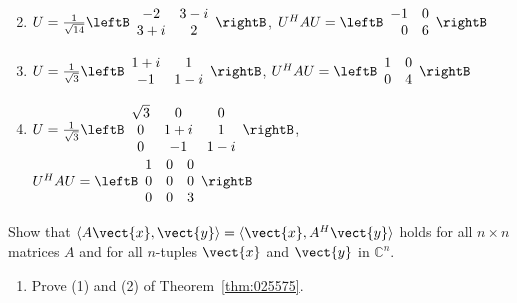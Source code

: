 \begin{multicols}{2}
\begin{ex}
\begin{enumerate}[label={\alph*.}]
\end{enumerate}
\begin{sol}
\begin{enumerate}[label={\alph*.}]
\setcounter{enumi}{1}
\item  $U = \frac{1}{\sqrt{14}}\leftB \begin{array}{cc}
-2 & 3 - i \\
3 + i & 2
\end{array}\rightB$, $U^HAU = \leftB \begin{array}{rr}
-1 & 0 \\
0 & 6
\end{array}\rightB$

\setcounter{enumi}{3}
\item  $U = \frac{1}{\sqrt{3}}\leftB \begin{array}{cc}
1 + i & 1 \\
-1 & 1 - i
\end{array}\rightB$, $U^HAU = \leftB \begin{array}{rr}
1 & 0 \\
0 & 4
\end{array}\rightB$

\setcounter{enumi}{5}
\item  $U = \frac{1}{\sqrt{3}}\leftB \begin{array}{ccc}
\sqrt{3} & 0 & 0 \\
0 & 1 + i & 1 \\
0 & -1 & 1 - i
\end{array}\rightB$, $U^HAU = \leftB \begin{array}{rrr}
1 & 0 & 0 \\
0 & 0 & 0 \\
0 & 0 & 3
\end{array}\rightB$

\end{enumerate}
\end{sol}
\end{ex}

\begin{ex}
Show that $\langle A \vect{x}, \vect{y} \rangle = \langle \vect{x}, A^{H}\vect{y}\rangle$ holds for all $n \times n$ matrices $A$ and for all $n$-tuples $\vect{x}$ and $\vect{y}$ in $\mathbb{C}^n$.
\end{ex}

\begin{ex}\label{ex:8_6_10}
\begin{enumerate}[label={\alph*.}]
\item Prove (1) and (2) of Theorem~\ref{thm:025575}.


\end{enumerate}
\end{ex}
\end{multicols}
